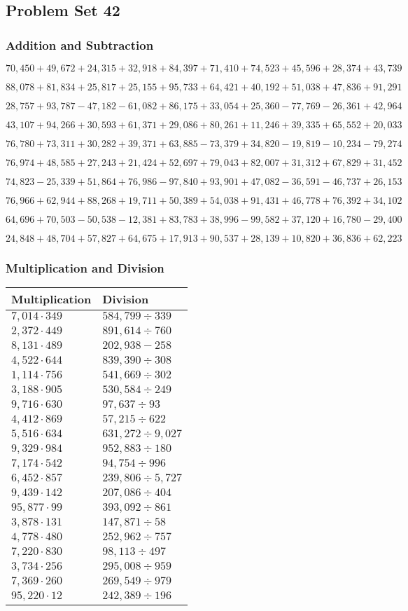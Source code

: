\hypertarget{problem-set-42-3}{%
\subsection{Problem Set 42}\label{problem-set-42-3}}

\hypertarget{addition-and-subtraction-264}{%
\subsubsection{Addition and
Subtraction}\label{addition-and-subtraction-264}}

\(70,450+49,672+24,315+32,918+84,397+71,410+74,523+45,596+28,374+ 43,739\)

\(88,078+81,834+25,817+25,155+95,733+64,421+40,192+51,038+47,836+91,291\)

\(28,757+93,787-47,182-61,082+86,175+33,054+25,360-77,769-26,361+42,964\)

\(43,107+94,266+30,593+61,371+29,086+80,261+11,246+39,335+65,552+20,033\)

\(76,780+73,311+30,282+39,371+63,885-73,379+34,820-19,819-10,234-79,274\)

\(76,974+48,585+27,243+21,424+52,697+79,043+82,007+31,312+67,829+31,452\)

\(74,823-25,339+51,864+76,986-97,840+93,901+47,082-36,591-46,737+26,153\)

\(76,966+62,944+88,268+19,711+50,389+54,038+91,431+46,778+76,392+34,102\)

\(64,696+70,503-50,538-12,381+83,783+38,996-99,582+37,120+16,780-29,400\)

\(24,848+48,704+57,827+64,675+17,913+90,537+28,139+10,820+36,836+62,223\)

\hypertarget{multiplication-and-division-263}{%
\subsubsection{Multiplication and
Division}\label{multiplication-and-division-263}}

\begin{longtable}[]{@{}ll@{}}
\toprule
Multiplication & Division\tabularnewline
\midrule
\endhead
\(7,014\cdot349\) & \(584,799÷339\)\tabularnewline
\(2,372\cdot449\) & \(891,614÷760\)\tabularnewline
\(8,131\cdot489\) & \(202,938 - 258\)\tabularnewline
\(4,522\cdot644\) & \(839,390÷308\)\tabularnewline
\(1,114\cdot756\) & \(541,669÷302\)\tabularnewline
\(3,188\cdot905\) & \(530,584÷249\)\tabularnewline
\(9,716\cdot630\) & \(97,637÷93\)\tabularnewline
\(4,412\cdot869\) & \(57,215÷622\)\tabularnewline
\(5,516\cdot634\) & \(631,272÷9,027\)\tabularnewline
\(9,329\cdot984\) & \(952,883÷180\)\tabularnewline
\(7,174\cdot542\) & \(94,754÷996\)\tabularnewline
\(6,452\cdot857\) & \(239,806÷5,727\)\tabularnewline
\(9,439\cdot142\) & \(207,086÷404\)\tabularnewline
\(95,877\cdot99\) & \(393,092÷861\)\tabularnewline
\(3,878\cdot131\) & \(147,871÷58\)\tabularnewline
\(4,778\cdot480\) & \(252,962÷757\)\tabularnewline
\(7,220\cdot830\) & \(98,113÷497\)\tabularnewline
\(3,734\cdot256\) & \(295,008÷959\)\tabularnewline
\(7,369\cdot260\) & \(269,549÷979\)\tabularnewline
\(95,220\cdot12\) & \(242,389÷196\)\tabularnewline
\bottomrule
\end{longtable}

